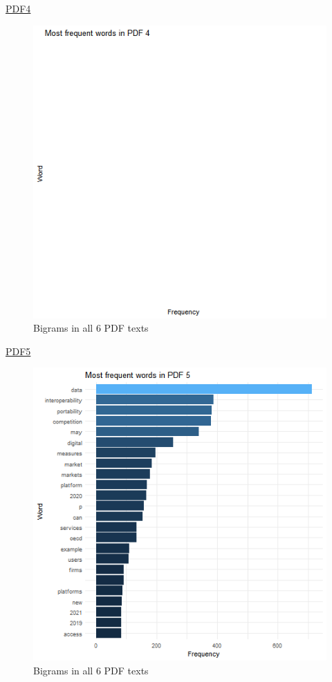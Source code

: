 \documentclass[
]{book}
\begin{document}
\href{https://www.europarl.europa.eu/RegData/etudes/STUD/2020/652752/IPOL_STU(2020)652752_EN.pdf}{PDF4}

\begin{figure}

{\centering \includegraphics[width=0.8\linewidth]{img/freqP4} 

}

\caption{Bigrams in all 6 PDF texts}\label{fig:nice-figF4}
\end{figure}

\href{https://esas-joint-committee.europa.eu/Publications/Reports/JC\%202018\%2074\%20Joint\%20Report\%20on\%20Regulatory\%20Sandboxes\%20and\%20Innovation\%20Hubs.pdf}{PDF5}

\begin{figure}

{\centering \includegraphics[width=0.8\linewidth]{img/freqP5} 

}

\caption{Bigrams in all 6 PDF texts}\label{fig:nice-figF5}
\end{figure}
\end{document}
